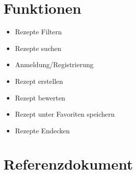 \documentclass{article}
\begin{document}
\section{Funktionen}
\begin{multicols}{2}
    \begin{itemize}
        \item Rezepte Filtern
        \item Rezepte suchen
        \item Anmeldung/Registrierung
        \item Rezept erstellen
        \item Rezept bewerten
        \item Rezept unter Favoriten speichern
        \item Rezepte Endecken
    \end{itemize}
\end{multicols}

\pagebreak
\section{Referenzdokument}
\end{document}

